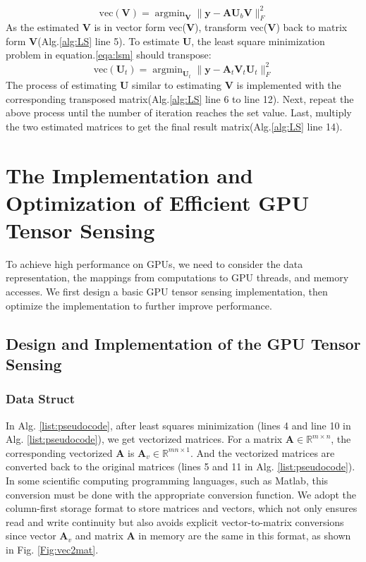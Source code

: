 \documentclass[futureinternet,article,submit,moreauthors,pdftex,10pt,a4paper]{Definitions/mdpi}
\theoremstyle{plain}
\theoremstyle{definition}
\theoremstyle{remark}
\begin{document}
        \begin{equation}
            \label{eqa:lsm}
            \text{vec}(\mathbf{V})=
        \mathop{\arg\min}_{ \mathbf{V}} \| \mathbf{y} - \mathbf{A}\mathbf{U}_b\mathbf{V} \|_F^2
        \end{equation}
        As the estimated $\mathbf{V}$ is in vector form vec($\mathbf{V}$), transform vec($\mathbf{V}$) back to matrix form $\mathbf{V}$(Alg.\ref{alg:LS} line 5).
        To estimate $\mathbf{U}$, the least square minimization problem in equation.\ref{eqa:lsm} should transpose:
        \begin{equation}
            \label{eqa:lsm1}
            \text{vec}(\mathbf{U}_t)=
        \mathop{\arg\min}_{ \mathbf{U}_t} \| \mathbf{y} - \mathbf{A}_t\mathbf{V}_t\mathbf{U}_t \|_F^2
        \end{equation}
        The process of estimating $\mathbf{U}$ similar to estimating $\mathbf{V}$ is implemented with the corresponding transposed matrix(Alg.\ref{alg:LS} line 6 to line 12).
        Next, repeat the above process until the number of iteration reaches the set value.
        Last, multiply the two estimated matrices to get the final result matrix(Alg.\ref{alg:LS} line 14).
\section{The Implementation and Optimization of Efficient GPU Tensor Sensing}
\label{SEC_GPU}
To achieve high performance on GPUs, we need to consider the data representation, the mappings from computations to GPU threads, and memory accesses. We first design a basic GPU tensor sensing implementation, then optimize the implementation to further improve performance.

\subsection{Design and Implementation of the GPU Tensor Sensing}
\subsubsection{Data Struct}
In Alg. \ref{list:pseudocode}, after least squares minimization (lines 4 and line 10 in Alg. \ref{list:pseudocode}), we get vectorized matrices. For a matrix $\mathbf{A} \in \mathbb{R}^{m \times n}$, the corresponding vectorized $\mathbf{A}$ is $\mathbf{A}_v \in \mathbb{R}^{mn \times 1}$. And the vectorized matrices are converted back to the original matrices (lines 5 and 11 in Alg. \ref{list:pseudocode}). In some scientific computing programming languages, such as Matlab, this conversion must be done with the appropriate conversion function.
We adopt the column-first storage format to store matrices and vectors, which not only ensures read and write continuity but also avoids explicit vector-to-matrix conversions since vector $\mathbf{A}_v$ and matrix $\mathbf{A}$ in memory are the same in this format, as shown in Fig. \ref{Fig:vec2mat}.
\end{document}
